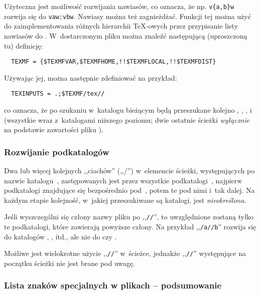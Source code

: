 \documentclass{article}
\renewcommand{\samp}[1]{,,\texttt{#1}''}  %
\begin{document}
Użyteczna jest możliwość rozwijania nawiasów, co oznacza, że np.
\verb+v{a,b}w+ rozwija się  do \verb+vaw:vbw+.
Nawiasy można też zagnieżdżać.
Funkcji tej można użyć do zaimplementowania różnych hierarchii \TeX-owych
przez przypisanie listy nawiasów do .
W~dostarczonym pliku  można znaleźć następującą (uproszczoną tu)
definicję:
\begin{verbatim}
  TEXMF = {$TEXMFVAR,$TEXMFHOME,!!$TEXMFLOCAL,!!$TEXMFDIST}
\end{verbatim}
Używając jej, można następnie zdefiniować na przykład:
\begin{verbatim}
  TEXINPUTS = .;$TEXMF/tex//
\end{verbatim}
co oznacza, że po szukaniu w~katalogu bieżącym będą przeszukane kolejno
, , ,
i~ (wszystkie wraz z~katalogami niższego poziomu;
dwie ostatnie ścieżki \emph{wyłącznie} na podstawie zawartości
pliku ).

\subsubsection{Rozwijanie podkatalogów}
\label{sec:subdirectory-expansion}

Dwa lub więcej kolejnych ,,ciachów'' (,,/'') w~elemencie ścieżki,
występujących po nazwie katalogu~, zastępowanych jest przez wszystkie
podkatalogi~, najpierw podkatalogi znajdujące się  bezpośrednio
pod~, potem te pod nimi i~tak dalej.  Na każdym etapie
kolejność, w~jakiej przeszukiwane są katalogi, jest \emph{nieokreślona}.

Jeśli wyszczególni się  człony nazwy pliku po \samp{//}, to uwzględnione zostaną
tylko te podkatalogi, które zawierają powyższe człony.
Na przykład \samp{/a//b} rozwija się  do katalogów ,
,  itd., ale nie do  czy .

Możliwe jest wielokrotne użycie \samp{//} w~ścieżce, jednakże \samp{//}
występujące na początku ścieżki nie jest brane pod uwagę.

\subsubsection{Lista znaków specjalnych w plikach  -- podsumowanie}
\label{sec:cnf-special-chars}
\end{document}
